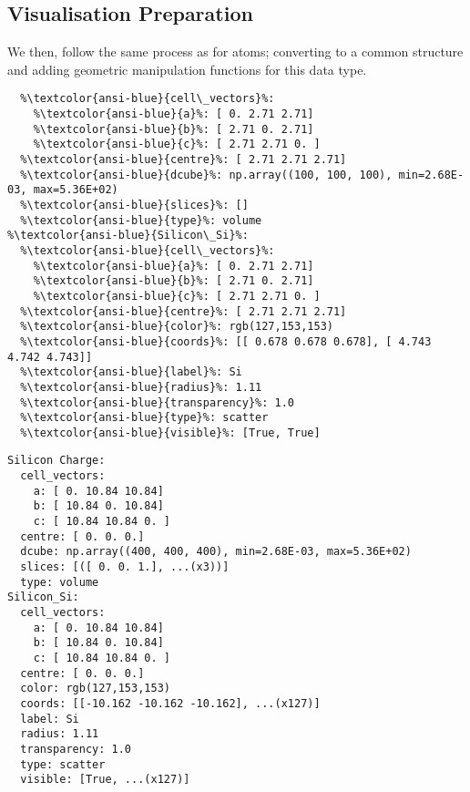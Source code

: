 \documentclass[10pt,parskip=half,
	toc=sectionentrywithdots,
	bibliography=totocnumbered,
	captions=tableheading,numbers=noendperiod]{scrartcl}
\begin{document}
\subsection{Visualisation Preparation}\label{visualisation-preparation}

We then, follow the same process as for atoms; converting to a common
structure and adding geometric manipulation functions for this data
type.

\begin{lstlisting}[language={},postbreak={},numbers=none,xrightmargin=7pt,belowskip=5pt,aboveskip=5pt,breakindent=0pt,escapechar=\%]
%\textcolor{ansi-blue}{Silicon Charge}%: 
  %\textcolor{ansi-blue}{cell\_vectors}%: 
    %\textcolor{ansi-blue}{a}%: [ 0. 2.71 2.71]
    %\textcolor{ansi-blue}{b}%: [ 2.71 0. 2.71]
    %\textcolor{ansi-blue}{c}%: [ 2.71 2.71 0. ]
  %\textcolor{ansi-blue}{centre}%: [ 2.71 2.71 2.71]
  %\textcolor{ansi-blue}{dcube}%: np.array((100, 100, 100), min=2.68E-03, max=5.36E+02)
  %\textcolor{ansi-blue}{slices}%: []
  %\textcolor{ansi-blue}{type}%: volume
%\textcolor{ansi-blue}{Silicon\_Si}%: 
  %\textcolor{ansi-blue}{cell\_vectors}%: 
    %\textcolor{ansi-blue}{a}%: [ 0. 2.71 2.71]
    %\textcolor{ansi-blue}{b}%: [ 2.71 0. 2.71]
    %\textcolor{ansi-blue}{c}%: [ 2.71 2.71 0. ]
  %\textcolor{ansi-blue}{centre}%: [ 2.71 2.71 2.71]
  %\textcolor{ansi-blue}{color}%: rgb(127,153,153)
  %\textcolor{ansi-blue}{coords}%: [[ 0.678 0.678 0.678], [ 4.743 4.742 4.743]]
  %\textcolor{ansi-blue}{label}%: Si
  %\textcolor{ansi-blue}{radius}%: 1.11
  %\textcolor{ansi-blue}{transparency}%: 1.0
  %\textcolor{ansi-blue}{type}%: scatter
  %\textcolor{ansi-blue}{visible}%: [True, True]

\end{lstlisting}

\begin{lstlisting}[language={},postbreak={},numbers=none,xrightmargin=7pt,belowskip=5pt,aboveskip=5pt,breakindent=0pt]
Silicon Charge: 
  cell_vectors: 
    a: [ 0. 10.84 10.84]
    b: [ 10.84 0. 10.84]
    c: [ 10.84 10.84 0. ]
  centre: [ 0. 0. 0.]
  dcube: np.array((400, 400, 400), min=2.68E-03, max=5.36E+02)
  slices: [([ 0. 0. 1.], ...(x3))]
  type: volume
Silicon_Si: 
  cell_vectors: 
    a: [ 0. 10.84 10.84]
    b: [ 10.84 0. 10.84]
    c: [ 10.84 10.84 0. ]
  centre: [ 0. 0. 0.]
  color: rgb(127,153,153)
  coords: [[-10.162 -10.162 -10.162], ...(x127)]
  label: Si
  radius: 1.11
  transparency: 1.0
  type: scatter
  visible: [True, ...(x127)]

\end{lstlisting}
\end{document}
